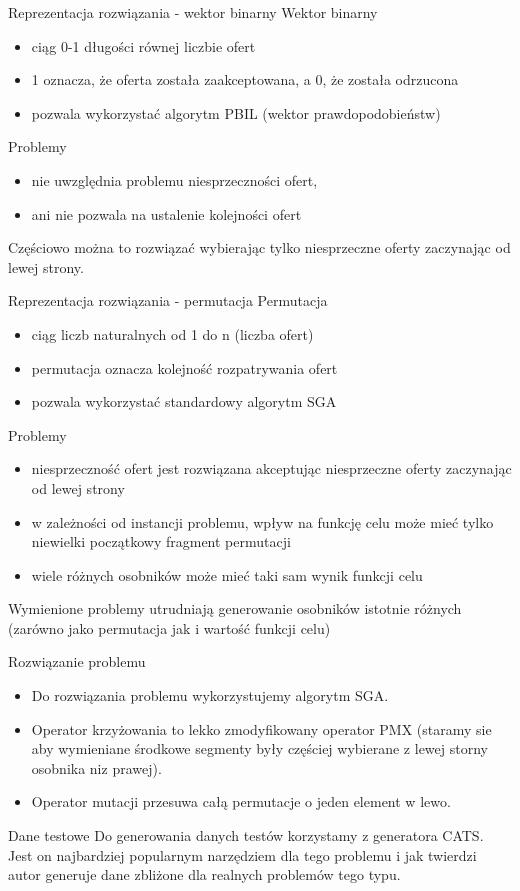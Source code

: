 \begin{frame}{Reprezentacja rozwiązania - wektor binarny}
Wektor binarny
\begin{itemize}
\item ciąg 0-1 długości równej liczbie ofert
\item 1 oznacza, że oferta została zaakceptowana, a 0, że została odrzucona
\item pozwala wykorzystać algorytm PBIL (wektor prawdopodobieństw)
\end{itemize}
\vspace{1em}
Problemy
\begin{itemize}
\item nie uwzględnia problemu niesprzeczności ofert,
\item ani nie pozwala na ustalenie kolejności ofert
\end{itemize}
Częściowo można to rozwiązać wybierając tylko niesprzeczne oferty zaczynając od lewej strony.
\end{frame}

\begin{frame}{Reprezentacja rozwiązania - permutacja}
Permutacja
\begin{itemize}
\item ciąg liczb naturalnych od 1 do n (liczba ofert)
\item permutacja oznacza kolejność rozpatrywania ofert
\item pozwala wykorzystać standardowy algorytm SGA
\end{itemize}
\vspace{1em}
Problemy
\begin{itemize}
\item niesprzeczność ofert jest rozwiązana akceptując niesprzeczne oferty zaczynając od lewej strony
\item w zależności od instancji problemu, wpływ na funkcję celu może mieć tylko niewielki początkowy fragment permutacji
\item wiele różnych osobników może mieć taki sam wynik funkcji celu
\end{itemize}
Wymienione problemy utrudniają generowanie osobników istotnie różnych (zarówno jako permutacja jak i wartość funkcji celu)
\end{frame}

\begin{frame}{Rozwiązanie problemu}
    \begin{itemize}
        \item Do rozwiązania problemu wykorzystujemy algorytm SGA.
        \item Operator krzyżowania to lekko zmodyfikowany operator PMX (staramy sie aby wymieniane środkowe segmenty były częściej wybierane z lewej storny osobnika niz prawej).
        \item Operator mutacji przesuwa całą permutacje o jeden element w lewo.
    \end{itemize}
\end{frame}

\begin{frame}{Dane testowe}
    Do generowania danych testów korzystamy z generatora CATS. Jest on najbardziej popularnym narzędziem dla tego problemu i jak twierdzi autor generuje dane zbliżone dla realnych problemów tego typu.
\end{frame}


